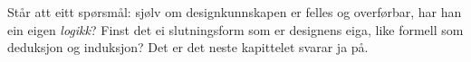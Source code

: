 \vignett

Står att eitt spørsmål: sjølv om designkunnskapen er felles og overførbar, har han ein eigen \emph{logikk}? Finst det ei slutningsform som er designens eiga, like formell som deduksjon og induksjon? Det er det neste kapittelet svarar ja på.

